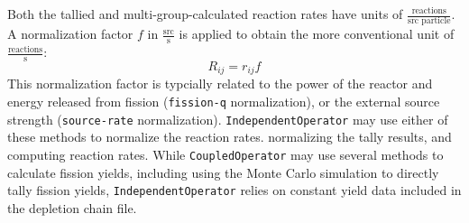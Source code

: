         Both the tallied and multi-group-calculated reaction rates have units of
        $\frac{\text{reactions}}{\text{src particle}}$. A normalization factor
        $f$ in $\frac{\text{src}}{\text{s}}$ is applied to obtain the more
        conventional unit of $\frac{\text{reactions}}{\text{s}}$:
        \begin{equation}
            R_{ij} = r_{ij} f
        \end{equation}
        This normalization factor is typcially related to the power of the
        reactor and energy released from fission (\verb.fission-q.
        normalization), or the external source strength (\verb.source-rate.
        normalization). \verb.IndependentOperator. may use either of these methods to normalize
        the reaction rates. normalizing the tally results, and computing
        reaction rates. While \verb.CoupledOperator. may use several methods to
        calculate fission yields, including using the Monte Carlo simulation to
        directly tally fission yields, \verb.IndependentOperator. relies on
        constant yield data included in the depletion chain file.

